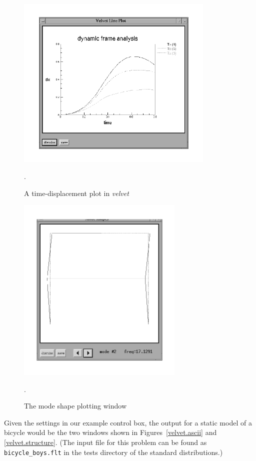 \begin{figure}
\begin{center}
 \includegraphics[width=3.73in]{figures/velvet_graph}
\end{center}
\caption{A time-displacement plot in {\em velvet}}.
\label{velvet.graph}
\end{figure}

\begin{figure}
\begin{center}
 \includegraphics[width=3.14in]{figures/velvet_modal}
\end{center}
\caption{The mode shape plotting window}.
\label{velvet.modal}
\end{figure}

Given the settings in our example control box, the output for a
static model of a bicycle would be the two windows shown in 
Figures~\ref{velvet.ascii} and \ref{velvet.structure}. (The input file
for this problem can be found as {\tt bicycle\_boys.flt} in the tests
directory of the standard \felt{} distributions.)

